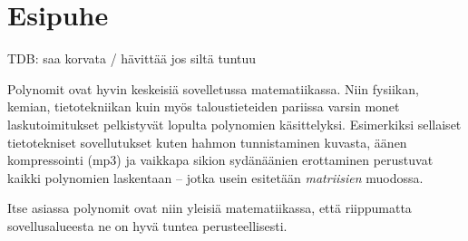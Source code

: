 \chapter*{Esipuhe}

TDB: saa korvata / hävittää jos siltä tuntuu

Polynomit ovat hyvin keskeisiä sovelletussa matematiikassa.
Niin fysiikan, kemian, tietotekniikan kuin myös taloustieteiden
pariissa varsin monet laskutoimitukset pelkistyvät lopulta
polynomien käsittelyksi. Esimerkiksi sellaiset tietotekniset
sovellutukset kuten hahmon tunnistaminen kuvasta, äänen
kompressointi (mp3) ja vaikkapa sikion sydänäänien erottaminen
perustuvat kaikki polynomien laskentaan -- jotka usein esitetään
\emph{matriisien} muodossa.

Itse asiassa polynomit ovat niin yleisiä matematiikassa, että riippumatta
sovellusalueesta ne on hyvä tuntea perusteellisesti.
